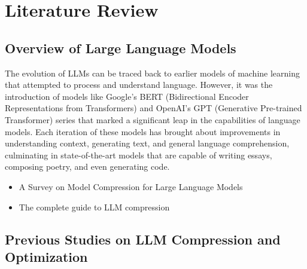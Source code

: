 \chapter{Literature Review}

\section{Overview of Large Language Models}
    The evolution of LLMs can be traced back to earlier models of machine learning that attempted to process and understand language. However, it was the introduction of models like Google's BERT (Bidirectional Encoder Representations from Transformers) and OpenAI's GPT (Generative Pre-trained Transformer) series that marked a significant leap in the capabilities of language models. Each iteration of these models has brought about improvements in understanding context, generating text, and general language comprehension, culminating in state-of-the-art models that are capable of writing essays, composing poetry, and even generating code.
    \begin{itemize}
        \item A Survey on Model Compression for Large Language Models
        \item The complete guide to LLM compression
    \end{itemize}

\section{Previous Studies on LLM Compression and Optimization}

